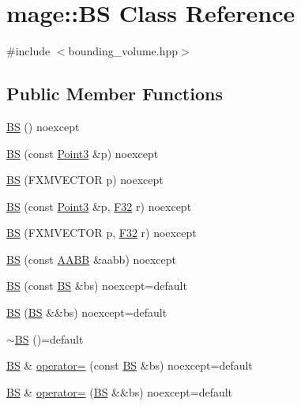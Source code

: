 \hypertarget{classmage_1_1_b_s}{}\section{mage\+:\+:BS Class Reference}
\label{classmage_1_1_b_s}


{\ttfamily \#include $<$bounding\+\_\+volume.\+hpp$>$}

\subsection*{Public Member Functions}
\begin{DoxyCompactItemize}
\item 
\hyperlink{classmage_1_1_b_s_a16e3f5e75f0af8f88f5c0fca7101975e}{BS} () noexcept
\item 
\hyperlink{classmage_1_1_b_s_a46aff6504f39d82f71f59a22e8c3c27f}{BS} (const \hyperlink{structmage_1_1_point3}{Point3} \&p) noexcept
\item 
\hyperlink{classmage_1_1_b_s_af34e47f0eaf20ad63ede96542724e926}{BS} (F\+X\+M\+V\+E\+C\+T\+OR p) noexcept
\item 
\hyperlink{classmage_1_1_b_s_a53b2b936c18cd5422b3a4f973c022fa4}{BS} (const \hyperlink{structmage_1_1_point3}{Point3} \&p, \hyperlink{namespacemage_aa97e833b45f06d60a0a9c4fc22ae02c0}{F32} r) noexcept
\item 
\hyperlink{classmage_1_1_b_s_ab0a7036fb7535a47de840b1966d8132d}{BS} (F\+X\+M\+V\+E\+C\+T\+OR p, \hyperlink{namespacemage_aa97e833b45f06d60a0a9c4fc22ae02c0}{F32} r) noexcept
\item 
\hyperlink{classmage_1_1_b_s_a012f3080f7c6697b30e62b7ae562e2d2}{BS} (const \hyperlink{classmage_1_1_a_a_b_b}{A\+A\+BB} \&aabb) noexcept
\item 
\hyperlink{classmage_1_1_b_s_a9ab4d8dd41ba41a6e754047684d929ff}{BS} (const \hyperlink{classmage_1_1_b_s}{BS} \&bs) noexcept=default
\item 
\hyperlink{classmage_1_1_b_s_a24384edc5e7bfee4fae6d0616b39be2c}{BS} (\hyperlink{classmage_1_1_b_s}{BS} \&\&bs) noexcept=default
\item 
\hyperlink{classmage_1_1_b_s_a111f60f8ab53c7497ff7aaa743619829}{$\sim$\+BS} ()=default
\item 
\hyperlink{classmage_1_1_b_s}{BS} \& \hyperlink{classmage_1_1_b_s_a2c6a3a8b1fc1f6c073d35e9bff0e5863}{operator=} (const \hyperlink{classmage_1_1_b_s}{BS} \&bs) noexcept=default
\item 
\hyperlink{classmage_1_1_b_s}{BS} \& \hyperlink{classmage_1_1_b_s_aec1cd810cb8cd42e3def7a74ba432a7c}{operator=} (\hyperlink{classmage_1_1_b_s}{BS} \&\&bs) noexcept=default

\end{DoxyCompactItemize}
